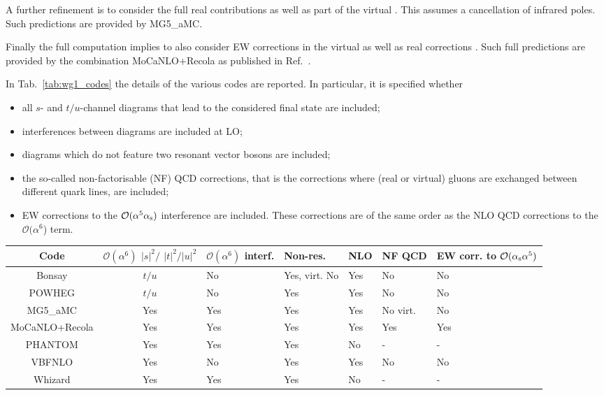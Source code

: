 A further refinement is to consider the full real contributions as well as part of the virtual .
This assumes a cancellation of infrared poles.
Such predictions are provided by {\sc MG5\_aMC}.

Finally the full computation implies to also consider EW corrections in the virtual as well as real corrections \cite{Biedermann:2017bss}.
Such full predictions are provided by the combination {\sc MoCaNLO+Recola} as published in Ref.~\cite{Biedermann:2017bss}.

In Tab.~\ref{tab:wg1_codes} the details of the various codes are reported. In particular, it is specified whether
\begin{itemize}
    \item all $s$- and $t/u$-channel diagrams that lead to the considered final state are included;
    \item interferences between diagrams are included at LO;
    \item diagrams which do not feature two resonant vector bosons are included;
    \item the so-called non-factorisable (NF) QCD corrections, that is the corrections where (real or virtual) gluons are exchanged between different quark lines,
        are included;
    \item EW corrections to the $\mathcal O (\alpha^5\alpha_\text{s})$ interference are included. These corrections are of the same order as the NLO QCD corrections to
        the  $\mathcal O (\alpha^6$) term.
\end{itemize}

\begin{table*}[ht!]
    \footnotesize
    \begin{tabularx}{\textwidth}{c|c|X|X|X|X|X}
        Code  &  $\mathcal O(\alpha^6)$ $|s|^2/$ $|t|^2/|u|^2$  &  $\mathcal O(\alpha^6)$ interf.  &  Non-res.  & NLO &  NF QCD  &  EW corr. to $\mathcal O(\alpha_\text{s} \alpha^5)$  \\
        \hline
        \hline
        {\sc Bonsay}        &  $t/u$    &  No       &  Yes, virt. No    &  Yes   & No       &  No  \\
        {\sc POWHEG}        &  $t/u$    &  No       &  Yes              &  Yes   & No       &  No  \\
        {\sc MG5\_aMC}      &  Yes      &  Yes      &  Yes              &  Yes   & No virt. &  No \\
        {\sc MoCaNLO+Recola}&  Yes      &  Yes      &  Yes              &  Yes   & Yes      &  Yes  \\
        {\sc PHANTOM}       &  Yes      &  Yes      &  Yes              &  No    & -        & - \\  
        {\sc VBFNLO}        &  Yes      &  No       &  Yes              &  Yes   & No       &  No  \\
        {\sc Whizard}       &  Yes      &  Yes      &  Yes              &  No    & -        & - \\  
    \end{tabularx}
    \caption{\label{tab:wg1_codes} Summary of the different properties of the codes employed in the comparison.}
\end{table*}
